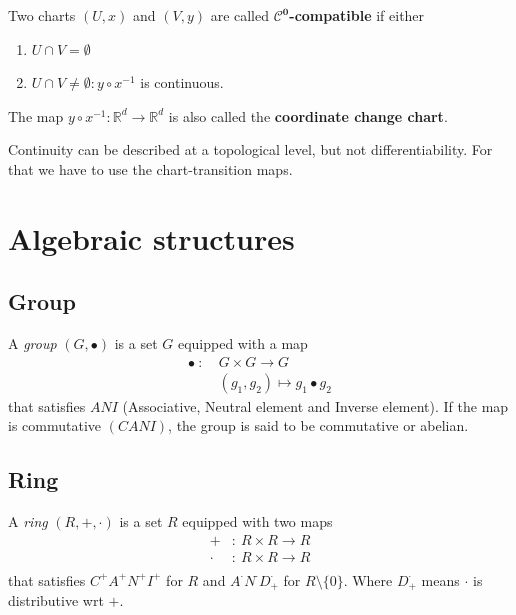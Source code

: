 \documentclass[root.tex]{subfiles}
\begin{document}
\begin{mydef}
  Two charts $(U,x)$ and $(V,y)$ are called $\boldsymbol{\mathcal{C}^0}$\textbf{-compatible} if either
  \begin{enumerate}
    \item $U\cap V = \emptyset$
    \item $U\cap V \neq \emptyset : y \circ x^{-1}$ is continuous.
  \end{enumerate}
\end{mydef}

\begin{remark}
  The map $y \circ x^{-1}: \mathbb{R}^d \to \mathbb{R}^d$ is also called the \textbf{coordinate change chart}.
\end{remark}

\begin{remark}
  Continuity can be described at a topological level, but not differentiability. For that we have to use the chart-transition maps.
\end{remark}


\chapter{Algebraic structures}%
\section{Group}
\begin{mydef}
  A \emph{group} $(G,\bullet)$ is a set $G$ equipped with a map
  \begin{align*}
    \bullet\ :\ &G \times G \rightarrow G\\
                &(g_1, g_2) \mapsto g_1 \bullet g_2
  \end{align*}
  that satisfies $ANI$ (Associative, Neutral element and Inverse element). If the map is commutative $(CANI)$, the group is said to be commutative or abelian.
\end{mydef}
\section{Ring}
\begin{mydef}
  A \emph{ring} $(R, +, \cdot )$ is a set $R$ equipped with two maps
  \begin{align*}
    +      &:\ R \times R \rightarrow R\\
    \cdot\ &:\ R \times R \rightarrow R\\
  \end{align*}
  that satisfies $C^{+}A^{+}N^{+}I^{+}$ for $R$ and $A^{\cdot}N^{\cdot}D^{\cdot}_{+}$  for $R\setminus \{0\}$. Where $D^{\cdot}_+$ means $\cdot$ is distributive wrt $+$.
\end{mydef}
\end{document}
